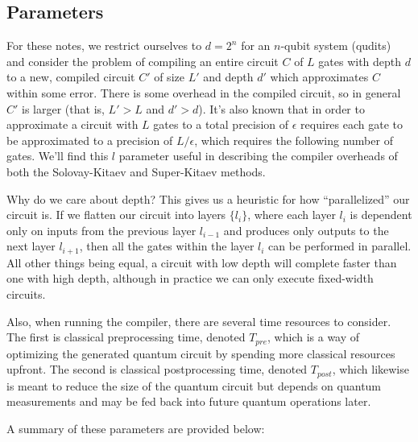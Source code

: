 \documentclass{article}
\theoremstyle{plain}
\begin{document}
\subsection{Parameters}

For these notes, we restrict ourselves to $d=2^n$ for an $n$-qubit system (qudits)
and consider the problem of compiling an entire circuit $C$ of $L$ gates with depth
$d$ to a new, compiled circuit $C'$ of size $L'$ and depth $d'$ which approximates
$C$ within some error. There is some overhead in the compiled circuit, so in
general $C'$ is larger (that is, $L' > L$ and $d' > d$). It's also known that
in order to approximate a circuit with $L$ gates to a total precision of $\epsilon$
requires each gate to be approximated to a precision of $L/\epsilon$, which requires
the following number of gates. We'll find this $l$ parameter useful in describing the compiler overheads of
both the Solovay-Kitaev and Super-Kitaev methods.

Why do we care about depth? This gives us a heuristic for how ``parallelized'' our
circuit is. If we flatten our circuit into layers $\{l_i\}$, where each layer $l_i$
is dependent only on inputs from the previous layer $l_{i-1}$ and produces
only outputs to the next layer $l_{i+1}$, then all the gates within the layer
$l_i$ can be performed in parallel. All other things being equal, a circuit with low depth will complete
faster than one with high depth, although in practice we can only execute
fixed-width circuits.

Also, when running the compiler, there are several time resources to consider.
The first is classical preprocessing time, denoted $T_{pre}$, which is a way of optimizing
the generated quantum circuit by spending more classical resources upfront.
The second is classical postprocessing time, denoted $T_{post}$, which likewise
is meant to reduce the size of the quantum circuit but depends on quantum
measurements and may be fed back into future quantum operations later.

A summary of these parameters are provided below:
\end{document}
